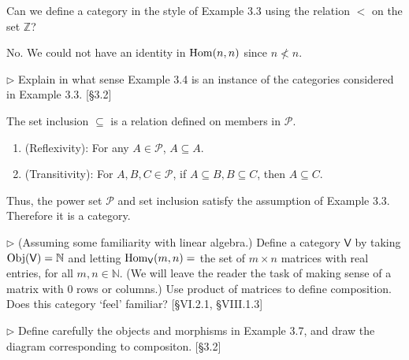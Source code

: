 \begin{problem}[3.4]
  Can we define a category in the style of Example 3.3 using the relation $<$ on
  the set $\mathbb{Z}$?
\end{problem}

\begin{solution}
No. We could not have an identity in $\mathrm{Hom}(n,n)$ since $n \nless n$.
\end{solution}

\begin{problem}[3.5]
  $\rhd$ Explain in what sense Example 3.4 is an instance of the categories
  considered in Example 3.3. [\S 3.2]
\end{problem}

\begin{solution}
The set inclusion $\subseteq$ is a relation defined on members in $\mathscr{P}$.
\begin{enumerate}
\item (Reflexivity): For any $A\in \mathscr{P}$, $A\subseteq A$.
\item (Transitivity): For $A, B, C\in \mathscr{P}$, if $A\subseteq B, B\subseteq C$, then $A\subseteq C$.
\end{enumerate} 
Thus, the power set $\mathscr{P}$ and set inclusion satisfy the assumption of Example 3.3. Therefore it is a category.
\end{solution}

\begin{problem}[3.6]
  $\rhd$ (Assuming some familiarity with linear algebra.) Define a category
  $\mathsf{V}$ by taking $\mathrm{Obj}(\mathsf{V}) = \mathbb{N}$ and letting
  $\mathrm{Hom}_{\mathsf{V}}(m,n) = $ the set of $m\times n$ matrices with real
  entries, for all $m,n\in\mathbb{N}$. (We will leave the reader the task of
  making sense of a matrix with 0 rows or columns.) Use product of matrices to
  define composition. Does this category `feel' familiar? [\S VI.2.1, \S VIII.1.3]
\end{problem}

\begin{solution}

\end{solution}


\begin{problem}[3.7]
  $\rhd$ Define carefully the objects and morphisms in Example 3.7, and draw the
  diagram corresponding to compositon. [\S 3.2]
\end{problem}

